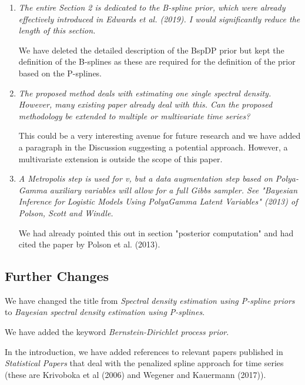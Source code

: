 \documentclass{scrartcl}
\newcommand{\refereeQuote}{\textit }
\newcommand{\response}{}
\begin{document}
\begin{enumerate}
\item
\refereeQuote{The entire Section 2 is dedicated to the B-spline prior, which were already effectively introduced in Edwards et al. (2019). I would significantly reduce the length of this section.}\smallskip

\response{We have deleted the detailed description of the BspDP prior but kept the definition of the B-splines as these are required for the definition of the prior based on the  P-splines.}\bigskip

\item 
\refereeQuote{The proposed method deals with estimating one single spectral density. However, many existing paper already deal with this. Can the proposed methodology be extended to multiple or multivariate time series?}\smallskip

\response{
 This could be a
very interesting avenue for future research and we have added a paragraph in the Discussion suggesting a potential approach. However, a multivariate extension is outside the scope of this paper.}\bigskip

\item
\refereeQuote{A Metropolis step is used for v, but a data augmentation step based on Polya-Gamma auxiliary variables will allow for a full Gibbs sampler. See "Bayesian Inference for Logistic Models Using PolyaGamma Latent Variables" (2013) of Polson, Scott and Windle.}\smallskip

\response{We had already pointed this out in section "posterior computation" and had cited the paper by Polson et al. (2013).}

\end{enumerate}


\subsection*{Further Changes}


We have changed the title from {\em Spectral density estimation using P-spline priors} to {\em Bayesian spectral density estimation using P-splines}.\smallskip

We have added the keyword {\em Bernstein-Dirichlet process prior}.\smallskip

In the introduction, we have added references to relevant papers published in {\em Statistical Papers} that deal with the penalized spline approach for time series (these are Krivoboka et al (2006) and Wegener and Kauermann (2017)).
\end{document}
